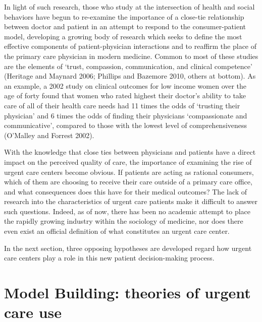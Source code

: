 \documentclass[12pt,twoside]{reedthesis}
\begin{document}
  In light of such research, those who study at the intersection of health
  and social behaviors have begun to re-examine the importance of a
  close-tie relationship between doctor and patient in an attempt to
  respond to the consumer-patient model, developing a growing body of
  research which seeks to define the most effective components of
  patient-physician interactions and to reaffirm the place of the primary
  care physician in modern medicine. Common to most of these studies are
  the elements of `trust, compassion, communication, and clinical
  competence' (Heritage and Maynard 2006; Phillips and Bazemore 2010,
  others at bottom). As an example, a 2002 study on clinical outcomes for
  low income women over the age of forty found that women who rated
  highest their doctor's ability to take care of all of their health care
  needs had 11 times the odds of `trusting their physician' and 6 times
  the odds of finding their physicians `compassionate and communicative',
  compared to those with the lowest level of comprehensiveness (O'Malley
  and Forrest 2002).
  
  With the knowledge that close ties between physicians and patients have
  a direct impact on the perceived quality of care, the importance of
  examining the rise of urgent care centers become obvious. If patients
  are acting as rational consumers, which of them are choosing to receive
  their care outside of a primary care office, and what consequences does
  this have for their medical outcomes? The lack of research into the
  characteristics of urgent care patients make it difficult to answer such
  questions. Indeed, as of now, there has been no academic attempt to
  place the rapidly growing industry within the sociology of medicine, nor
  does there even exist an official definition of what constitutes an
  urgent care center.
  
  In the next section, three opposing hypotheses are developed regard how
  urgent care centers play a role in this new patient decision-making
  process.
  
  \chapter*{Model Building: theories of urgent care
  use}\label{model-building-theories-of-urgent-care-use}
  
  \onehalfspacing
  
\end{document}
